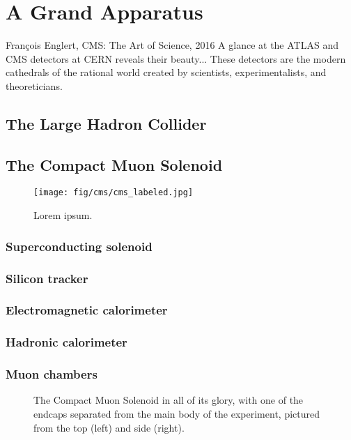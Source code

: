 \chapter{A Grand Apparatus}
\begin{aquote}{Fran\c{c}ois Englert, CMS: The Art of Science, 2016}
    A glance at the ATLAS and CMS detectors at CERN reveals their beauty...
    These detectors are the modern cathedrals of the rational world created by scientists, experimentalists, and theoreticians. 
\end{aquote}
\section{The Large Hadron Collider}
\section{The Compact Muon Solenoid}
\begin{figure}[htb]
    \centering
    \texttt{[image: fig/cms/cms\_labeled.jpg]}
    \caption{
        Lorem ipsum.
    }
    \label{fig:cms_labeled}
\end{figure}
\subsection{Superconducting solenoid}
\subsection{Silicon tracker}
\subsection{Electromagnetic calorimeter}
\subsection{Hadronic calorimeter}
\subsection{Muon chambers}
\begin{figure}[htb]
    \centering
    \quad
    \caption{
        The Compact Muon Solenoid in all of its glory, with one of the endcaps separated from the main body of the experiment, pictured from the top (left) and side (right). 
    }
    \label{fig:cms_pics}
\end{figure}

